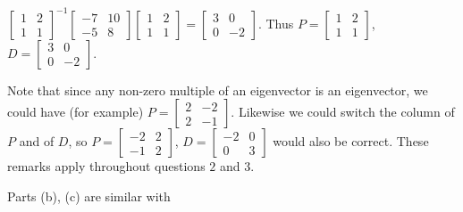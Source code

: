 \begin{enumerate}
\begin{description}
$\left [\begin {array}{rr} 1&2\\1&1 \end{array} \right]^{-1} \left
[\begin {array}{rr} -7&10 \\ -5&8 \end {array}\right] \left
[\begin {array}{rr} 1&2 \\ 1&1 \end {array}\right]=\left [\begin
{array}{rr} 3&0 \\ 0&-2 \end {array}\right]$. Thus $P=\left
[\begin {array}{rr} 1&2 \\ 1&1 \end {array}\right]$, $D=\left
[\begin {array}{rr} 3&0 \\ 0&-2 \end {array}\right]$.

Note that since any non-zero multiple of an eigenvector is an
eigenvector, we could have (for example) $P=\left [\begin
{array}{rr} 2&-2 \\ 2&-1 \end {array}\right]$. Likewise we could
switch the column of $P$ and of $D$, so $P=\left [\begin
{array}{rr} -2&2 \\ -1&2 \end {array}\right]$, $D=\left [\begin
{array}{rr} -2&0 \\ 0&3 \end {array}\right]$ would also be
correct. These remarks apply throughout questions $2$ and $3$.

\noindent Parts (b), (c) are similar with


\end{description}
\end{enumerate}
